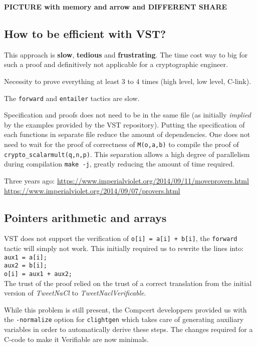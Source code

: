 \textbf{PICTURE with memory and arrow and DIFFERENT SHARE}

\subsection{How to be efficient with VST?}

This approach is \textbf{slow}, \textbf{tedious} and \textbf{frustrating}.
The time cost way to big for such a proof and definitively not applicable for a
cryptographic engineer.

Necessity to prove everything at least 3 to 4 times (high level, low level, C-link).

The \texttt{forward} and \texttt{entailer} tactics are slow.

Specification and proofs does not need to be in the same file (as initially \textit{implied}
by the examples provided by the VST repository). Putting the specification of each
functions in separate file reduce the amount of dependencies. One does not need
to wait for the proof of correctness of \texttt{M(o,a,b)} to compile the proof of \texttt{crypto\_scalarmult(q,n,p)}.
This separation allows a high degree of parallelism during compilation \texttt{make -j},
greatly reducing the amount of time required.

Three years ago:
\url{https://www.imperialviolet.org/2014/09/11/moveprovers.html}
\url{https://www.imperialviolet.org/2014/09/07/provers.html}

\subsection{Pointers arithmetic and arrays}

VST does not support the verification of \texttt{o[i] = a[i] + b[i]},
the \texttt{forward} tactic will simply not work. This initially required us to
rewrite the lines into:\\
\texttt{aux1 = a[i];\\
aux2 = b[i];\\
o[i] = aux1 + aux2;}\\
The trust of the proof relied on the trust of a correct translation from the
initial version of \textit{TweetNaCl} to \textit{TweetNaclVerificable}.

While this problem is still present, the Compcert developpers provided us with
the \texttt{-normalize} option for \texttt{clightgen} which takes care of
generating auxiliary variables in order to automatically derive these steps.
The changes required for a C-code to make it Verifiable are now minimals.

